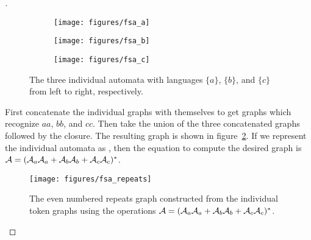 \begin{proof}[\unskip\nopunct]

\begin{figure}
    \centering
    \begin{subfigure}[b]{0.32\textwidth}
        \centering
        \texttt{[image: figures/fsa\_a]}
    \end{subfigure}
    \begin{subfigure}[b]{0.32\textwidth}
        \centering
        \texttt{[image: figures/fsa\_b]}
    \end{subfigure}
    \begin{subfigure}[b]{0.32\textwidth}
        \centering
        \texttt{[image: figures/fsa\_c]}
    \end{subfigure}
    \caption{The three individual automata with languages $\{a\}$, $\{b\}$, and
    $\{c\}$ from left to right, respectively.}
    \label{fig:fsa_tokens}
\end{figure}

First concatenate the individual graphs with themselves to get graphs which
recognize $aa$, $bb$, and $cc$. Then take the union of the three
concatenated graphs followed by the closure. The resulting graph is shown
in figure~\ref{fig:fsa_repeats}. If we represent the individual automata as
, then the equation to compute the desired graph is $\mathcal{A} = (\mathcal{A}_a\mathcal{A}_a +
\mathcal{A}_b\mathcal{A}_b + \mathcal{A}_c\mathcal{A}_c)^*$.

\begin{figure}
    \centering
    \texttt{[image: figures/fsa\_repeats]}
    \caption{The even numbered repeats graph constructed from the individual
    token graphs using the operations $\mathcal{A} = (\mathcal{A}_a\mathcal{A}_a + \mathcal{A}_b\mathcal{A}_b +
    \mathcal{A}_c\mathcal{A}_c)^*$.}
    \label{fig:fsa_repeats}
\end{figure}

\end{proof}
